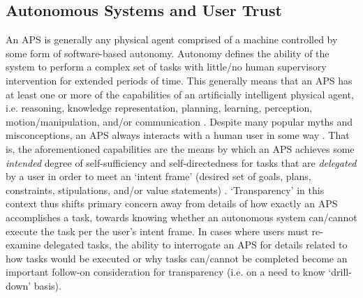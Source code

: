 \subsection{Autonomous Systems and User Trust}
An APS is generally any physical agent comprised of a machine controlled by some form of software-based autonomy. Autonomy defines the ability of the system to perform a complex set of tasks with little/no human supervisory intervention for extended periods of time. This generally means that an APS has at least one or more of the capabilities of an artificially intelligent physical agent, i.e. reasoning, knowledge representation, planning, learning, perception, motion/manipulation, and/or communication \cite{Israelsen2018-es}. 
Despite many popular myths and misconceptions, an APS always interacts with a human user in some way \cite{Bradshaw2013-ck}. 
That is, the aforementioned capabilities are the means by which an APS achieves some \emph{intended} degree of self-sufficiency and self-directedness for tasks that are \emph{delegated} by a user in order to meet an `intent frame' (desired set of goals, plans, constraints, stipulations, and/or value statements) \cite{Miller2014-av}. `Transparency' in this context thus shifts primary concern away from details of how exactly an APS accomplishes a task, towards knowing whether an autonomous system can/cannot execute the task per the user's intent frame. 
In cases where users must re-examine delegated tasks, the ability to interrogate an APS for details related to how tasks would be executed or why tasks can/cannot be completed become an important follow-on consideration for transparency (i.e. on a need to know `drill-down' basis). 

